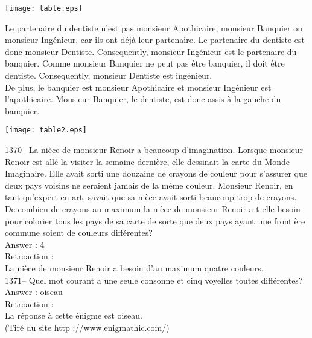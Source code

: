 ﻿\documentclass[letterpaper, 12pt]{article}
\begin{document}
    \begin{flushleft}
    \texttt{[image: table.eps]}
    \end{flushleft}

Le partenaire du dentiste n'est pas monsieur Apothicaire, monsieur Banquier
ou monsieur Ing\'enieur, car ils ont d\'ej\`a leur partenaire.  Le
partenaire du dentiste est donc monsieur Dentiste.  Consequently,
monsieur Ing\'enieur est le partenaire du banquier.  Comme monsieur Banquier
ne peut pas \^etre banquier, il doit \^etre dentiste.  Consequently,
monsieur Dentiste est ing\'enieur.  \\
De plus, le banquier est monsieur Apothicaire et monsieur Ing\'enieur est
l'apothicaire.  Monsieur Banquier, le dentiste, est donc assis \`a la gauche
du banquier.\\

    \begin{center}
    \texttt{[image: table2.eps]}
    \end{center}

1370-- La ni\`ece de monsieur Renoir a beaucoup d'imagination.
Lorsque monsieur Renoir est all\'e la visiter la semaine derni\`ere,
elle dessinait la carte du \og Monde Imaginaire\fg .  Elle avait
sorti une douzaine de crayons de couleur pour s'assurer que deux
pays voisins ne seraient jamais de la m\^eme couleur.  Monsieur
Renoir, en tant qu'expert en art, savait que sa ni\`ece avait sorti
beaucoup trop de crayons.  De combien de crayons au maximum la
ni\`ece de monsieur Renoir a-t-elle besoin pour colorier tous les
pays de sa carte de sorte que deux pays ayant une fronti\`ere
commune soient de
couleurs diff\'erentes?\\

Answer : 4\\

Retroaction : \\
La ni\`ece de monsieur Renoir a besoin d'au maximum quatre couleurs.\\

1371-- Quel mot courant a une seule consonne et cinq voyelles toutes
diff\'erentes?\\

Answer : oiseau\\

Retroaction : \\
La r\'eponse \`a cette \'enigme est oiseau.\\
(Tir\'e du site http ://www.enigmathic.com/)\\
\end{document}
